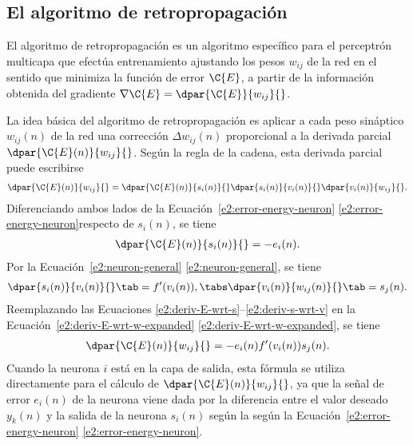 %
%
\subsection{El algoritmo de retropropagación}
%
El algoritmo de retropropagación es un algoritmo específico para el
perceptrón multicapa que efectúa entrenamiento ajustando los pesos
$w_{ij}$ de la red en el sentido que minimiza la función de error
$\C{E}$, a partir de la información obtenida del gradiente
$\nabla\C{E}=\dpar{\C{E}}{w_{ij}}{}$.


La idea básica del algoritmo de retropropagación es aplicar a cada
peso sináptico $w_{ij}(n)$ de la red una corrección
$\Delta{}w_{ij}(n)$ proporcional a la derivada parcial
$\dpar{\C{E}(n)}{w_{ij}}{}$.  Según la regla de la cadena, esta
derivada parcial puede escribirse
%
\begin{align}\label{e2:deriv-E-wrt-w-expanded}
  \dpar{\C{E}(n)}{w_{ij}}{} = \dpar{\C{E}(n)}{s_i(n)}{}
  \dpar{s_i(n)}{v_i(n)}{} \dpar{v_i(n)}{w_{ij}}{}.
\end{align}
%
Diferenciando ambos lados de la
\iflatexml{}Ecuación~\ref{e2:error-energy-neuron}
\else\autoref{e2:error-energy-neuron}\fi respecto de $s_i(n)$, se tiene
%
\begin{align}\label{e2:deriv-E-wrt-s}
  \dpar{\C{E}(n)}{s_i(n)}{} = -e_i(n).
\end{align}
%
Por la \iflatexml{}Ecuación~\ref{e2:neuron-general}
\else\autoref{e2:neuron-general}\fi, se tiene
%
\begin{align}\label{e2:deriv-s-wrt-v}
  \dpar{s_i(n)}{v_i(n)}{} \tab = f'(v_i(n)),\tabs
  \dpar{v_i(n)}{w_{ij}(n)}{} \tab = s_j(n).\\
\end{align}
%
Reemplazando las Ecuaciones
\ref{e2:deriv-E-wrt-s}--\ref{e2:deriv-s-wrt-v} en la
\iflatexml{}Ecuación~\ref{e2:deriv-E-wrt-w-expanded}
\else\autoref{e2:deriv-E-wrt-w-expanded}\fi, se tiene
%
\begin{align}\label{e2:deriv-E-wrt-w}
  \dpar{\C{E}(n)}{w_{ij}}{} = -e_i(n) f'(v_i(n)) s_j(n).
\end{align}
%
Cuando la neurona $i$ está en la capa de salida, esta fórmula se
utiliza directamente para el cálculo de $\dpar{\C{E}(n)}{w_{ij}}{}$,
ya que la señal de error $e_i(n)$ de la neurona viene dada por la
diferencia entre el valor deseado $y_k(n)$ y la salida de la neurona
$s_i(n)$ según la según la
\iflatexml{}Ecuación~\ref{e2:error-energy-neuron}
\else\autoref{e2:error-energy-neuron}\fi.

